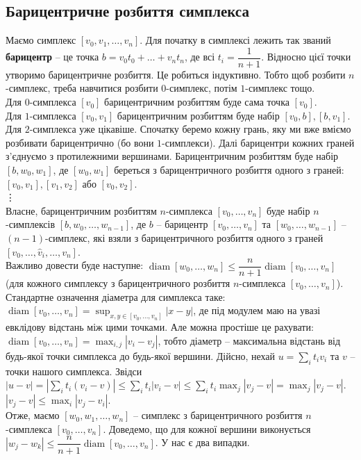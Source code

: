 \documentclass[a4paper, 10pt]{article}
\theoremstyle{theoremdd}
\theoremstyle{theoremdd}
\theoremstyle{theoremdd}
\theoremstyle{theoremdd}
\theoremstyle{theoremdd}
\theoremstyle{theoremdd}
\theoremstyle{theoremdd}
\theoremstyle{theoremdd}
\theoremstyle{theoremdd}
\theoremstyle{theoremdd}
\theoremstyle{theoremdd}
\theoremstyle{theoremdd}
\theoremstyle{theoremdd}
\theoremstyle{theoremdd}
\theoremstyle{theoremdd}
\DeclareMathOperator{\diam}{diam}
\begin{document}
\subsection{Барицентричне розбиття симплекса}
Маємо симплекс $[v_0,v_1,\dots,v_n]$. Для початку в симплексі лежить так званий \textbf{барицентр} -- це точка $b = v_0 t_0 + \dots + v_n t_n$, де всі $t_i = \dfrac{1}{n+1}$. Відносно цієї точки утворимо барицентричне розбиття. Це робиться індуктивно. Тобто щоб розбити $n$-симплекс, треба навчитися розбити $0$-симплекс, потім $1$-симплекс тощо.\\
Для $0$-симплекса $[v_0]$ барицентричним розбиттям буде сама точка $[v_0]$.\\
Для $1$-симплекса $[v_0,v_1]$ барицентричним розбиттям буде набір $[v_0,b],[b,v_1]$.\\
Для $2$-симплекса уже цікавіше. Спочатку беремо кожну грань, яку ми вже вміємо розбивати барицентрично (бо вони $1$-симплекси). Далі барицентри кожних граней з'єднуємо з протилежними вершинами. Барицентричним розбиттям буде набір $[b,w_0,w_1]$, де $[w_0,w_1]$ береться з барицентричного розбиття одного з граней: $[v_0,v_1],[v_1,v_2]$ або $[v_0,v_2]$.\\
\vdots \\
Власне, барицентричним розбиттям $n$-симплекса $[v_0,\dots,v_n]$ буде набір $n$-симплексів $[b,w_0,\dots,w_{n-1}]$, де $b$ -- барицентр $[v_0,\dots,v_n]$ та $[w_0,\dots,w_{n-1}]$ -- $(n-1)$-симплекс, які взяли з барицентричного розбиття одного з граней $[v_0,\dots,\hat{v}_i,\dots,v_n]$.
\bigskip \\
Важливо довести буде наступне: $\diam[w_0,\dots,w_{n}] \leq \dfrac{n}{n+1} \diam[v_0,\dots,v_n]$ (для кожного симплексу з барицентричного розбиття $n$-симплекса $[v_0,\dots,v_n]$).\\
Стандартне означення діаметра для симплекса таке: $\diam[v_0,\dots,v_n] = \displaystyle\sup_{x,y \in [v_0,\dots,v_n]} |x-y|$, де під модулем маю на увазі евклідову відстань між цими точками. Але можна простіше це рахувати: $\diam[v_0,\dots,v_n] = \displaystyle\max_{i,j} |v_i - v_j|$, тобто діаметр -- максимальна відстань від будь-якої точки симплекса до будь-якої вершини. Дійсно, нехай $u = \displaystyle\sum_i t_i v_i$ та $v$ -- точки нашого симплекса. Звідси\\
$|u-v| = \displaystyle\left| \sum_i t_i (v_i-v) \right| \leq \sum_i t_i |v_i-v| \leq \sum_i t_i \max_{j} |v_j-v| = \max_j |v_j-v|$. \quad $|v_j-v| \leq \displaystyle\max_{i} |v_j-v_i|$.\\
Отже, маємо $[w_0,w_1,\dots,w_n]$ -- симплекс з барицентричного розбиття $n$-симплекса $[v_0,\dots,v_n]$. Доведемо, що для кожної вершини виконується $|w_j - w_k| \leq \dfrac{n}{n+1} \diam[v_0,\dots,v_n]$. У нас є два випадки.\\
\end{document}
